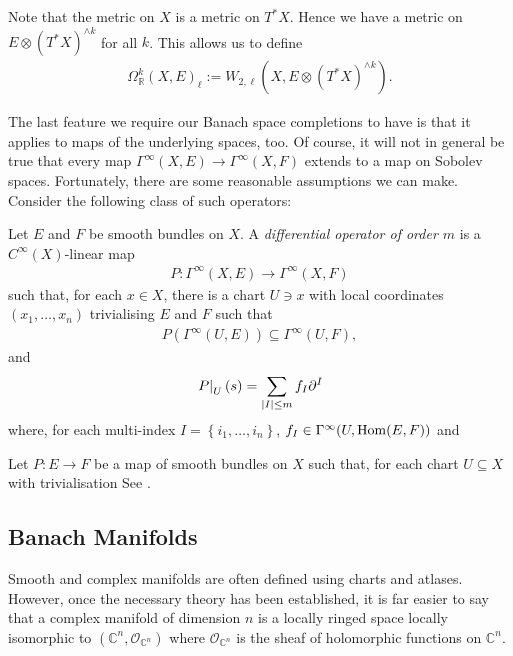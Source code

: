 \documentclass[12pt]{ociamthesis}  %
\begin{document}
\begin{example}
  Note that the metric on $X$ is a metric on $T^*X$. Hence we have
  a metric on $E\otimes (T^*X)^{\wedge k}$ for all $k$. This allows
  us to define
  \begin{align*}
    \Omega_{\mathbb{R}}^k(X,E)_\ell := W_{2,\ell}(X,E\otimes(T^*X)^{\wedge k}).
  \end{align*}
\end{example}

The last feature we require our Banach space completions to have is
that it applies to maps of the underlying spaces, too. Of course,
it will not in general be true that every map
$\Gamma^\infty(X,E)\to\Gamma^\infty(X,F)$ extends to a map on
Sobolev spaces. Fortunately, there are some reasonable assumptions
we can make. Consider the following class of such operators:

\begin{definition}
  Let $E$ and $F$ be smooth bundles on $X$. A \emph{differential
    operator of order $m$} is a $C^\infty(X)$-linear map
  \begin{align*}
    P : \Gamma^\infty(X,E) \to \Gamma^\infty(X,F)
  \end{align*}
  such that, for each $x\in X$, there is a chart $U\ni x$ with
  local coordinates $(x_1,\ldots,x_n)$ trivialising $E$ and $F$ such that
  \begin{align*}
    P(\Gamma^\infty(U,E))\subseteq \Gamma^\infty(U,F),
  \end{align*}
  and
  \begin{align*}
    \left.{P}\right\vert_{U}(s) = \sum_{|I|\leq m} f_I \partial^I
  \end{align*}
  where, for each multi-index
  $I=\left\lbrace{i_1,\ldots,i_n}\right\rbrace$,
  $f_I \in \Gamma^\infty(U,\operatorname{Hom}(E,F))$ and
\end{definition}

\begin{theorem}
  Let $P:E\to F$ be a map of smooth bundles on $X$ such that, for
  each chart $U\subseteq X$ with trivialisation
  See \cite[{Proposition 3.8.4}]{bc2009}.
\end{theorem}

\subsection{Banach Manifolds}

Smooth and complex manifolds are often defined using charts and
atlases. However, once the necessary theory has been established,
it is far easier to say that a complex manifold
of dimension $n$ is a locally ringed space locally isomorphic to
$(\mathbb{C}^n,\mathcal O_{\mathbb{C}^n})$ where
$\mathcal O_{\mathbb{C}^n}$ is the sheaf of holomorphic functions on
$\mathbb{C}^n$.
\end{document}
